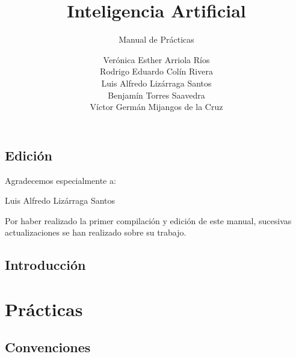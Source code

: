 \documentclass[12pt,openany]{book}
\title{Inteligencia Artificial}
\subtitle{Manual de Prácticas}
\author{
  Verónica Esther Arriola Ríos \\
  Rodrigo Eduardo Colín Rivera \\
  Luis Alfredo Lizárraga Santos \\
  Benjamín Torres Saavedra \\
  Víctor Germán Mijangos de la Cruz \\
}
\begin{document}
\maketitle

\chapter*{Edición}


Agradecemos especialmente a:

\begin{center}
 Luis Alfredo Lizárraga Santos
\end{center}
 
Por haber realizado la primer compilación y edición de este manual, sucesivas actualizaciones se han realizado sobre su trabajo.



\frontmatter %
\tableofcontents
\clearemptydoublepage %

\listofauxcodes


\mainmatter  %



\chapter*{Introducción}




\part{Prácticas}


\chapter*{Convenciones}
\end{document}
